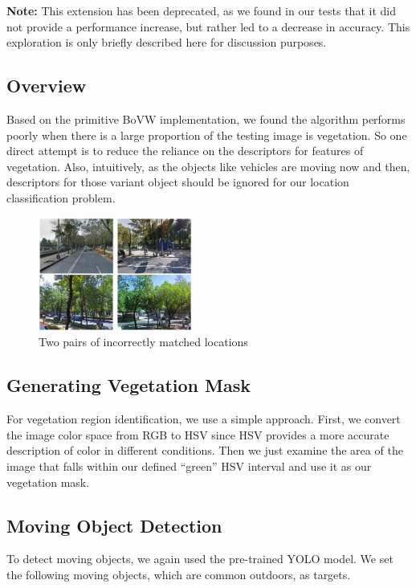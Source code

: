 \documentclass[conference]{IEEEtran}
\begin{document}
\textbf{Note:} This extension has been deprecated, as we found in our tests that it did not provide a performance increase, but rather led to a decrease in accuracy. This exploration is only briefly described here for discussion purposes.

\subsection{Overview}

Based on the primitive BoVW implementation, we found the algorithm performs poorly when there is a large proportion of the testing image is vegetation. So one direct attempt is to reduce the reliance on the descriptors for features of vegetation. Also, intuitively, as the objects like vehicles are moving now and then, descriptors for those variant object should be ignored for our location classification problem.

\begin{figure}[H]
    \centering
    \includegraphics[width=0.45\textwidth]{fig_2.png}
    \caption{Two pairs of incorrectly matched locations}
    \label{fig:2}
\end{figure}

\subsection{Generating Vegetation Mask}

For vegetation region identification, we use a simple approach. First, we convert the image color space from RGB to HSV since HSV provides a more accurate description of color in different conditions. Then we just examine the area of the image that falls within our defined ``green'' HSV interval and use it as our vegetation mask.

\subsection{Moving Object Detection}

To detect moving objects, we again used the pre-trained YOLO model. We set the following moving objects, which are common outdoors, as targets.
\end{document}
